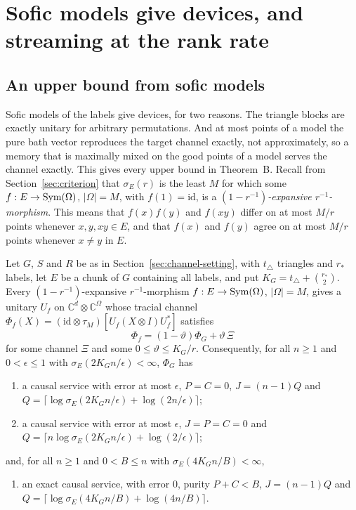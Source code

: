 \section{Sofic models give devices, and streaming at the rank rate}\label{sec:devices}

\subsection{An upper bound from sofic models}\label{sec:sofic-upper}

Sofic models of the labels give devices, for two reasons. The triangle blocks are exactly unitary for arbitrary permutations. And at most
points of a model the pure bath vector reproduces the target channel exactly, not approximately, so a memory that is maximally mixed on the
good points of a model serves the channel exactly. This gives every upper bound in Theorem~B. Recall from Section~\ref{sec:criterion}
that $\sigma_E(r)$ is the least $M$ for which some $f:E\to\operatorname{Sym}(\Omega)$, $|\Omega|=M$, with $f(1)=\mathrm{id}$, is a
\emph{$(1-r^{-1})$-expansive $r^{-1}$-morphism}. This means that $f(x)f(y)$ and $f(xy)$ differ on at most $M/r$ points whenever $x,y,xy\in E$,
and that $f(x)$ and $f(y)$ agree on at most $M/r$ points whenever $x\ne y$ in $E$.

\begin{proposition}\label{prop:sofic-upper}
Let $G$, $S$ and $R$ be as in Section~\ref{sec:channel-setting}, with $t_\triangle$ triangles and $r_*$ labels, let $E$ be a chunk of $G$ containing
all labels, and put $K_G=t_\triangle+\binom{r_*}2$. Every $(1-r^{-1})$-expansive $r^{-1}$-morphism $f:E\to\operatorname{Sym}(\Omega)$, $|\Omega|=M$, gives a unitary $U_f$ on
$\mathbb C^d\otimes\mathbb C^\Omega$ whose tracial channel $\Phi_f(X)=(\mathrm{id}\otimes\tau_M)[U_f(X\otimes I)U_f^*]$ satisfies
\[
\Phi_f=(1-\vartheta)\Phi_G+\vartheta\,\Xi
\]
for some channel $\Xi$ and some $0\le\vartheta\le K_G/r$. Consequently, for all $n\ge1$ and $0<\epsilon\le1$ with $\sigma_E(2K_Gn/\epsilon)<\infty$,
$\Phi_G$ has
\begin{enumerate}[label=(\alph*),itemsep=1pt]
\item a causal service with error at most $\epsilon$, $P=C=0$, $J=(n-1)Q$ and $Q=\bigl\lceil\log\sigma_E(2K_Gn/\epsilon)+\log(2n/\epsilon)\bigr\rceil$;
\item a causal service with error at most $\epsilon$, $J=P=C=0$ and $Q=\bigl\lceil n\log\sigma_E(2K_Gn/\epsilon)+\log(2/\epsilon)\bigr\rceil$;
\end{enumerate}
and, for all $n\ge1$ and $0<B\le n$ with $\sigma_E(4K_Gn/B)<\infty$,
\begin{enumerate}[label=(\alph*),itemsep=1pt,resume]
\item an exact causal service, with error $0$, purity $P+C<B$, $J=(n-1)Q$ and $Q=\bigl\lceil\log\sigma_E(4K_Gn/B)+\log(4n/B)\bigr\rceil$.
\end{enumerate}
\end{proposition}

